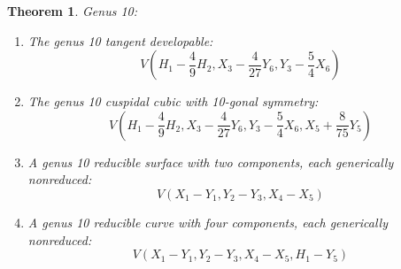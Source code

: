 \documentclass{amsart}[12pt]
\newtheorem{theorem}{Theorem}[section]
\theoremstyle{definition}
\numberwithin{equation}{section}
\begin{document}
\begin{theorem}
Genus 10:
  \begin{enumerate}
  \item[(a)] The genus 10 tangent developable:
  \[
V(H_1-\frac{4}{9}H_2, X_3-\frac{4}{27}Y_6, Y_3-\frac{5}{4}X_6)
  \]    
\item[(b)] The genus 10 cuspidal cubic with 10-gonal symmetry:
  \[
V(H_1-\frac{4}{9}H_2, X_3-\frac{4}{27}Y_6, Y_3-\frac{5}{4}X_6,X_5+\frac{8}{75}Y_5)
  \]
\item[(c)] A genus 10 reducible surface with two components, each generically nonreduced:
  \[
 V(X_1-Y_1,Y_2-Y_3,X_4-X_5)
\]   
\item[(d)] A genus 10 reducible curve with four components, each generically nonreduced:
  \[
 V(X_1-Y_1,Y_2-Y_3,X_4-X_5,H_1-Y_5)
\]
\end{enumerate}
\end{theorem}
\end{document}
